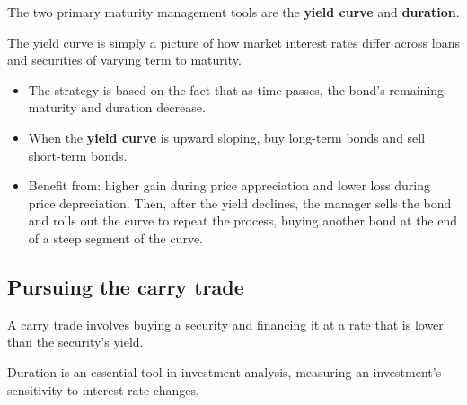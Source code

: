 The two primary maturity management tools are the \textbf{yield curve} and \textbf{duration}.

\begin{lrdefbox}
The yield curve is simply a picture of how market interest rates differ across loans and securities of varying term to maturity.
\end{lrdefbox}

\begin{lrkeybox}
\begin{itemize}
\item The strategy is based on the fact that as time passes, the bond's remaining maturity and duration decrease.
\item When the \textbf{yield curve} is upward sloping, buy long-term bonds and sell short-term bonds.
\item Benefit from: higher gain during price appreciation and lower loss during price depreciation. Then, after the yield declines, the manager sells the bond and rolls out the curve to repeat the process, buying another bond at the end of a steep segment of the curve.
\end{itemize}
\end{lrkeybox}

\subsection{Pursuing the carry trade}

A carry trade involves buying a security and financing it at a rate that is lower than the security's yield.

\begin{lrdefbox}[Duration]
Duration is an essential tool in investment analysis, measuring an investment's sensitivity to interest-rate changes.
\end{lrdefbox}

